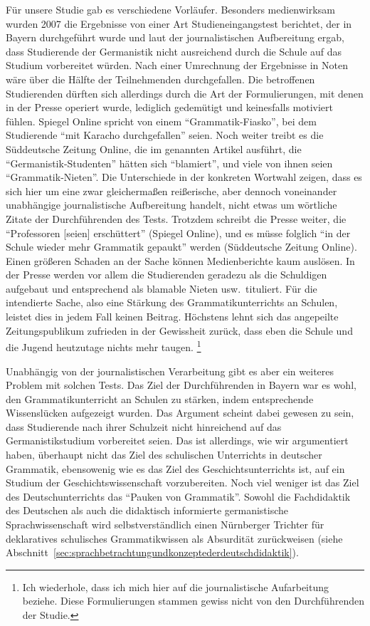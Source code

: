 Für unsere Studie gab es verschiedene Vorläufer.
Besonders medienwirksam wurden 2007 die Ergebnisse von einer Art Studieneingangstest berichtet, der in Bayern durchgeführt wurde und laut der journalistischen Aufbereitung \citep{Spiegelonline2007,Szonline2007} ergab, dass Studierende der Germanistik nicht ausreichend durch die Schule auf das Studium vorbereitet würden.
Nach einer Umrechnung der Ergebnisse in Noten wäre über die Hälfte der Teilnehmenden durchgefallen.
Die betroffenen Studierenden dürften sich allerdings durch die Art der Formulierungen, mit denen in der Presse operiert wurde, lediglich gedemütigt und keinesfalls motiviert fühlen.
Spiegel Online spricht von einem "`Grammatik-Fiasko"', bei dem Studierende "`mit Karacho durchgefallen"' seien.
Noch weiter treibt es die Süddeutsche Zeitung Online, die im genannten Artikel ausführt, die "`Germanistik-Studenten"' hätten sich "`blamiert"', und viele von ihnen seien "`Grammatik-Nieten"'.
Die Unterschiede in der konkreten Wortwahl zeigen, dass es sich hier um eine zwar gleichermaßen reißerische, aber dennoch voneinander unabhängige journalistische Aufbereitung handelt, nicht etwas um wörtliche Zitate der Durchführenden des Tests.
Trotzdem schreibt die Presse weiter, die "`Professoren [seien] erschüttert"' (Spiegel Online), und es müsse folglich "`in der Schule wieder mehr Grammatik gepaukt"' werden (Süddeutsche Zeitung Online). 
Einen größeren Schaden an der Sache können Medienberichte kaum auslösen.
In der Presse werden vor allem die Studierenden geradezu als die Schuldigen aufgebaut und entsprechend als blamable Nieten usw.\ tituliert.
Für die intendierte Sache, also eine Stärkung des Grammatikunterrichts an Schulen, leistet dies in jedem Fall keinen Beitrag.
Höchstens lehnt sich das angepeilte Zeitungspublikum zufrieden in der Gewissheit zurück, dass eben die Schule und die Jugend heutzutage nichts mehr taugen.%
\footnote{Ich wiederhole, dass ich mich hier auf die journalistische Aufarbeitung beziehe.
Diese Formulierungen stammen gewiss nicht von den Durchführenden der Studie.}

Unabhängig von der journalistischen Verarbeitung gibt es aber ein weiteres Problem mit solchen Tests.
Das Ziel der Durchführenden in Bayern war es wohl, den Grammatikunterricht an Schulen zu stärken, indem entsprechende Wissenslücken aufgezeigt wurden.
Das Argument scheint dabei gewesen zu sein, dass Studierende nach ihrer Schulzeit nicht hinreichend auf das Germanistikstudium vorbereitet seien.
Das ist allerdings, wie wir argumentiert haben, überhaupt nicht das Ziel des schulischen Unterrichts in deutscher Grammatik, ebensowenig wie es das Ziel des Geschichtsunterrichts ist, auf ein Studium der Geschichtswissenschaft vorzubereiten.
Noch viel weniger ist das Ziel des Deutschunterrichts das "`Pauken von Grammatik"'.
Sowohl die Fachdidaktik des Deutschen als auch die didaktisch informierte germanistische Sprachwissenschaft wird selbstverständlich einen Nürnberger Trichter für deklaratives schulisches Grammatikwissen als Absurdität zurückweisen (siehe Abschnitt~\ref{sec:sprachbetrachtungundkonzeptederdeutschdidaktik}).

